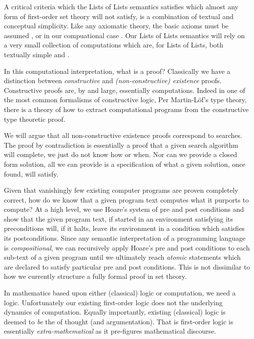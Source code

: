 A critical criteria which the Lists of Lists semantics satisfies which 
almost any form of first-order set theory will not satisfy, is a 
combination of textual and conceptual simplicity. Like any axiomatic 
theory, the basic axioms must be assumed , or in our 
compuational case . Our Lists of Lists 
semantics will rely on a very small collection of computations which are, 
for Lists of Lists, both textually simple and . 

In this computational interpretation, what is a proof? Classically we have 
a distinction between \emph{constructive} and \emph{(non-constructive) 
existence} proofs. Constructive proofs are, by and large, essentially 
computations. Indeed in one of the most common formalisms of constructive 
logic, Per Martin-L\"of's type theory, there is a theory of how to extract 
computational programs from the constructive type theoretic proof. 

We will argue that all non-constructive existence proofs correspond to 
searches. The proof by contradiction is essentially a proof that a given 
search algorithm will complete, we just do not know how or when. Nor can 
we provide a closed form solution, all we can provide is a specification 
of what a given solution, once found, will satisfy. 

Given that vanishingly few existing computer programs are proven 
completely correct, how do we know that a given program text computes what 
it purports to compute? At a high level, we use Hoare's system of pre and 
post conditions and show that the given program text, if started in an 
environment satisfying its preconditions will, if it halts, leave its 
environment in a condition which satisfies its postconditions. Since any 
semantic interpretation of a programming language is \emph{compositional}, 
we can recursively apply Hoare's pre and post conditions to each sub-text 
of a given program until we ultimately reach \emph{atomic} statements 
which are declared to satisfy particular pre and post conditions. This is 
not dissimilar to how we currently structure a fully formal proof in set 
theory. 

In mathematics based upon either (classical) logic or computation, we need 
a logic. Unfortunately our existing first-order logic does not  the underlying dynamics of computation. Equally importantly, 
existing (classical) logic is deemed to \emph{be} the  of 
 thought (and argumentation). That is first-order logic is 
essentially \emph{extra-mathematical} as it pre-figures mathematical 
discourse.

